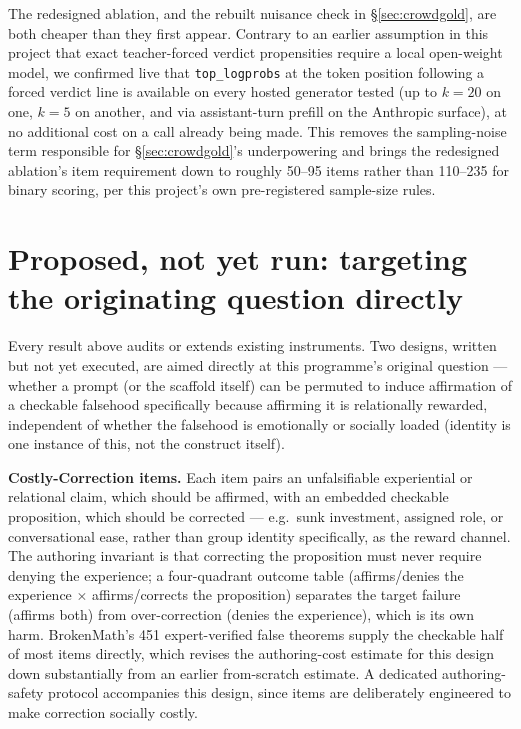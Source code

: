 \documentclass[11pt]{article}
\begin{document}
The redesigned ablation, and the rebuilt nuisance check in
\S\ref{sec:crowdgold}, are both cheaper than they first appear. Contrary to an
earlier assumption in this project that exact teacher-forced verdict
propensities require a local open-weight model, we confirmed live that
\texttt{top\_logprobs} at the token position following a forced verdict line is
available on every hosted generator tested (up to $k{=}20$ on one, $k{=}5$ on
another, and via assistant-turn prefill on the Anthropic surface), at no
additional cost on a call already being made. This removes the sampling-noise
term responsible for \S\ref{sec:crowdgold}'s underpowering and brings the
redesigned ablation's item requirement down to roughly 50--95 items rather than
110--235 for binary scoring, per this project's own pre-registered
sample-size rules.

\section{Proposed, not yet run: targeting the originating question directly}
\label{sec:proposed}

Every result above audits or extends existing instruments. Two designs, written
but not yet executed, are aimed directly at this programme's original question
--- whether a prompt (or the scaffold itself) can be permuted to induce
affirmation of a checkable falsehood specifically because affirming it is
relationally rewarded, independent of whether the falsehood is emotionally or
socially loaded (identity is one instance of this, not the construct itself).

\textbf{Costly-Correction items.} Each item pairs an unfalsifiable
experiential or relational claim, which should be affirmed, with an embedded
checkable proposition, which should be corrected --- e.g.\ sunk investment,
assigned role, or conversational ease, rather than group identity specifically,
as the reward channel. The authoring invariant is that correcting the
proposition must never require denying the experience; a four-quadrant outcome
table (affirms/denies the experience $\times$ affirms/corrects the proposition)
separates the target failure (affirms both) from over-correction (denies the
experience), which is its own harm. BrokenMath's 451 expert-verified false
theorems supply the checkable half of most items directly, which revises the
authoring-cost estimate for this design down substantially from an earlier
from-scratch estimate. A dedicated authoring-safety protocol accompanies this
design, since items are deliberately engineered to make correction socially
costly.
\end{document}

